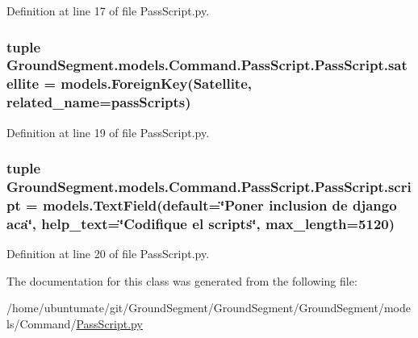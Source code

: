 Definition at line 17 of file Pass\+Script.\+py.

\hypertarget{class_ground_segment_1_1models_1_1_command_1_1_pass_script_1_1_pass_script_a75020614d363fc6903dc9912b3fd06fe}{}
\subsubsection[{satellite}]{\setlength{\rightskip}{0pt plus 5cm}tuple Ground\+Segment.\+models.\+Command.\+Pass\+Script.\+Pass\+Script.\+satellite = models.\+Foreign\+Key({\bf Satellite}, related\+\_\+name=\textquotesingle{}pass\+Scripts\textquotesingle{})\hspace{0.3cm}{\ttfamily [static]}}\label{class_ground_segment_1_1models_1_1_command_1_1_pass_script_1_1_pass_script_a75020614d363fc6903dc9912b3fd06fe}


Definition at line 19 of file Pass\+Script.\+py.

\hypertarget{class_ground_segment_1_1models_1_1_command_1_1_pass_script_1_1_pass_script_a48a085049e0623794c1742fde3752e42}{}
\subsubsection[{script}]{\setlength{\rightskip}{0pt plus 5cm}tuple Ground\+Segment.\+models.\+Command.\+Pass\+Script.\+Pass\+Script.\+script = models.\+Text\+Field(default=\char`\"{}Poner inclusion de django aca\char`\"{}, help\+\_\+text=\char`\"{}Codifique el scripts\char`\"{}, max\+\_\+length=5120)\hspace{0.3cm}{\ttfamily [static]}}\label{class_ground_segment_1_1models_1_1_command_1_1_pass_script_1_1_pass_script_a48a085049e0623794c1742fde3752e42}


Definition at line 20 of file Pass\+Script.\+py.



The documentation for this class was generated from the following file\+:\begin{DoxyCompactItemize}
\item 
/home/ubuntumate/git/\+Ground\+Segment/\+Ground\+Segment/\+Ground\+Segment/models/\+Command/\hyperlink{_pass_script_8py}{Pass\+Script.\+py}\end{DoxyCompactItemize}
